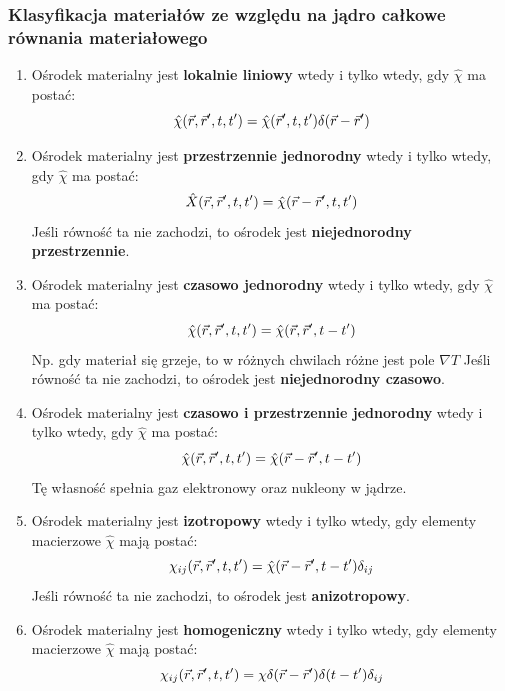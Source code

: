 \subsubsection{Klasyfikacja materiałów ze względu na jądro całkowe równania materiałowego}
\begin{enumerate}
\item Ośrodek materialny jest \textbf{lokalnie liniowy} wtedy i tylko wtedy, gdy $\hat{\chi}$ ma postać:
\begin{equation}\hat{\chi}(\vec{r},\vec{r}',t,t')=\hat{\chi}(\vec{r}',t,t')\delta(\vec{r}-\vec{r}')\end{equation}
\item Ośrodek materialny jest \textbf{przestrzennie jednorodny} wtedy i tylko wtedy, gdy $\hat{\chi}$ ma postać:
\begin{equation}\hat{X}(\vec{r},\vec{r}',t,t')=\hat{\chi}(\vec{r}-\vec{r}',t,t')\end{equation}
Jeśli równość ta nie zachodzi, to ośrodek jest \textbf{niejednorodny przestrzennie}.
\item Ośrodek materialny jest \textbf{czasowo jednorodny} wtedy i tylko wtedy, gdy $\hat{\chi}$ ma postać:
\begin{equation}\hat{\chi}(\vec{r},\vec{r}',t,t')=\hat{\chi}(\vec{r},\vec{r}',t-t')\end{equation}
 Np. gdy materiał się grzeje, to w różnych chwilach różne jest pole $\nabla T$
 Jeśli równość ta nie zachodzi, to ośrodek jest \textbf{niejednorodny czasowo}.
 \item Ośrodek materialny jest \textbf{czasowo i przestrzennie jednorodny} wtedy i tylko wtedy, gdy $\hat{\chi}$ ma postać:
\begin{equation}\hat{\chi}(\vec{r},\vec{r}',t,t')=\hat{\chi}(\vec{r}-\vec{r}',t-t')\end{equation}
 Tę własność spełnia gaz elektronowy oraz nukleony w jądrze.
  \item Ośrodek materialny jest \textbf{izotropowy} wtedy i tylko wtedy, gdy elementy macierzowe $\hat{\chi}$ mają postać:
\begin{equation}{\chi}_{ij}(\vec{r},\vec{r}',t,t')=\hat{\chi}(\vec{r}-\vec{r}',t-t')\delta_{ij}\end{equation}
 Jeśli równość ta nie zachodzi, to ośrodek jest \textbf{anizotropowy}.
 \item Ośrodek materialny jest \textbf{homogeniczny} wtedy i tylko wtedy, gdy elementy macierzowe $\hat{\chi}$ mają postać:
\begin{equation}{\chi}_{ij}(\vec{r},\vec{r}',t,t')={\chi}\delta(\vec{r}-\vec{r}')\delta(t-t')\delta_{ij}\end{equation}
\end{enumerate}
